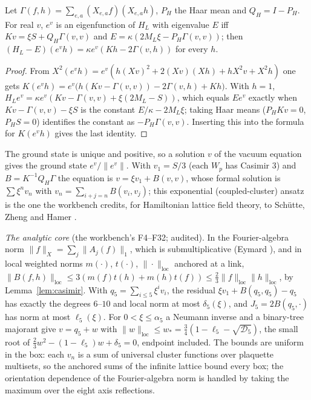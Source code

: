 \begin{lemma}\label{lem:gst}
Let $\Gamma(f,h)=\sum_{e,a}(X_{e,a}f)(X_{e,a}h)$, $P_H$ the Haar mean and $Q_H=I-P_H$. For real $v$, $e^v$ is an eigenfunction of $H_L$ with eigenvalue $E$ iff $Kv=\xi S+Q_H\Gamma(v,v)$ and $E=\kappa(2M_L\xi-P_H\Gamma(v,v))$; then $(H_L-E)(e^vh)=\kappa e^v(Kh-2\Gamma(v,h))$ for every $h$.
\end{lemma}
\begin{proof}
From $X^2(e^vh)=e^v(h(Xv)^2+2(Xv)(Xh)+hX^2v+X^2h)$ one gets $K(e^vh)=e^v\bigl(h(Kv-\Gamma(v,v))-2\Gamma(v,h)+Kh\bigr)$. With $h=1$, $H_Le^v=\kappa e^v(Kv-\Gamma(v,v)+\xi(2M_L-S))$, which equals $Ee^v$ exactly when $Kv-\Gamma(v,v)-\xi S$ is the constant $E/\kappa-2M_L\xi$; taking Haar means ($P_HKv=0$, $P_HS=0$) identifies the constant as $-P_H\Gamma(v,v)$. Inserting this into the formula for $K(e^vh)$ gives the last identity.
\end{proof}

The ground state is unique and positive, so a solution $v$ of the vacuum equation gives the ground state $e^v/\|e^v\|$. With $v_1=S/3$ (each $W_p$ has Casimir $3$) and $B=K^{-1}Q_H\Gamma$ the equation is $v=\xi v_1+B(v,v)$, whose formal solution is $\sum\xi^nv_n$ with $v_n=\sum_{i+j=n}B(v_i,v_j)$; this exponential (coupled-cluster) ansatz is the one the workbench credits, for Hamiltonian lattice field theory, to Schütte, Zheng and Hamer \cite{SchutteZhengHamer}.

\emph{The analytic core} (the workbench's F4--F32; audited). In the Fourier-algebra norm $\|f\|_X=\sum_j\|A_j(f)\|_1$, which is submultiplicative (Eymard \cite{Eymard}), and in local weighted norms $m(\cdot)$, $t(\cdot)$, $\|\cdot\|_{\mathrm{loc}}$ anchored at a link, $\|B(f,h)\|_{\mathrm{loc}}\le3(m(f)t(h)+m(h)t(f))\le\frac23\|f\|_{\mathrm{loc}}\|h\|_{\mathrm{loc}}$, by Lemma~\ref{lem:casimir}. With $q_5=\sum_{i\le5}\xi^iv_i$, the residual $\xi v_1+B(q_5,q_5)-q_5$ has exactly the degrees $6$--$10$ and local norm at most $\delta_5(\xi)$, and $J_5=2B(q_5,\cdot)$ has norm at most $\ell_5(\xi)$. For $0<\xi\le\alpha_5$ a Neumann inverse and a binary-tree majorant give $v=q_5+w$ with $\|w\|_{\mathrm{loc}}\le w_*=\frac34(1-\ell_5-\sqrt{\mathcal D_5})$, the small root of $\frac23w^2-(1-\ell_5)w+\delta_5=0$, endpoint included. The bounds are uniform in the box: each $v_n$ is a sum of universal cluster functions over plaquette multisets, so the anchored sums of the infinite lattice bound every box; the orientation dependence of the Fourier-algebra norm is handled by taking the maximum over the eight axis reflections.

